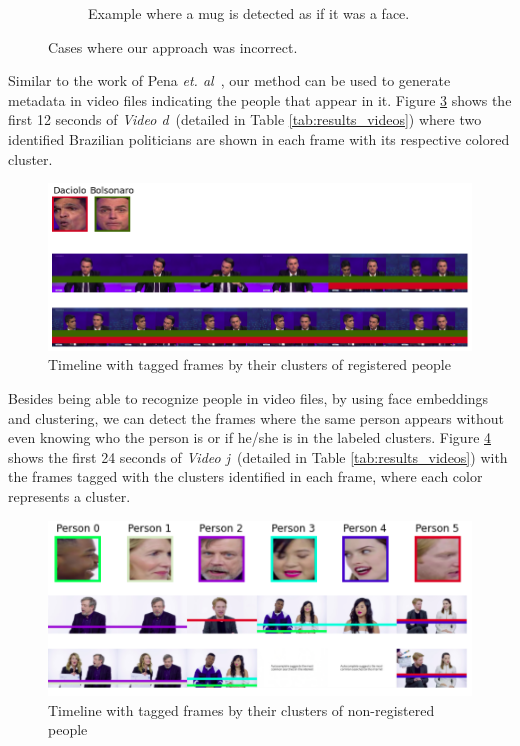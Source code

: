 \begin{figure}[!ht]
\begin{subfigure}{0.47\linewidth}
        \caption{Example where a mug is detected as if it was a face.}
        \label{fig:precision}
    \end{subfigure}
\caption{Cases where our approach was incorrect.}
\end{figure}

Similar to the work of Pena \emph{et. al}~\cite{globofacestream}, our method can be used to generate metadata in video files indicating the people that appear in it.
Figure \ref{fig:timeline_pol} shows the first 12 seconds of \emph{Video d}~(detailed in Table \ref{tab:results_videos}) where two identified Brazilian politicians are shown in each frame with its respective colored cluster.
\begin{figure}[!ht]
    \centering
    \includegraphics[width=0.8\linewidth]{img/face_recognition/timeline_pol.png}
    \caption{Timeline with tagged frames by their clusters of registered people}
    \label{fig:timeline_pol}
\end{figure}

Besides being able to recognize people in video files, by using face embeddings and clustering, we can detect the frames where the same person appears without even knowing who the person is or if he/she is in the labeled clusters.
Figure \ref{fig:timeline_non_reg} shows the first 24 seconds of \emph{Video j}~(detailed in Table \ref{tab:results_videos}) with the frames tagged with the clusters identified in each frame, where each color represents a cluster.

\begin{figure}[!ht]
    \centering
    \includegraphics[width=0.8\linewidth]{img/face_recognition/timeline2.png}
    \caption{Timeline with tagged frames by their clusters of non-registered people}
    \label{fig:timeline_non_reg}
\end{figure}


